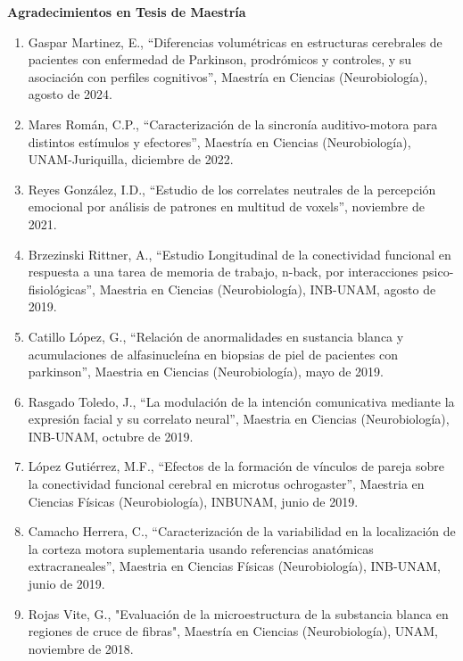 \textbf{Agradecimientos en Tesis de Maestría}

\hfill

\begin{enumerate}

\item Gaspar Martinez, E., “Diferencias volumétricas en estructuras cerebrales de pacientes con enfermedad de Parkinson, 
prodrómicos y controles, y su asociación con perfiles cognitivos”, Maestría en Ciencias (Neurobiología), agosto de 2024.

\item Mares Román, C.P., “Caracterización de la sincronía auditivo-motora para distintos estímulos y efectores”, Maestría 
en 
Ciencias (Neurobiología), UNAM-Juriquilla, diciembre de 2022.

\item Reyes González, I.D., “Estudio de los correlates neutrales de la percepción emocional por análisis de patrones en 
multitud de voxels”, noviembre de 2021.

\item Brzezinski Rittner, A., “Estudio Longitudinal de la conectividad funcional en respuesta a una tarea de memoria de 
trabajo, n-back, por interacciones psico-fisiológicas”, Maestria en Ciencias (Neurobiología), INB-UNAM, agosto de 2019.

\item Catillo López, G., “Relación de anormalidades en sustancia blanca y acumulaciones de alfasinucleína en biopsias de 
piel 
de pacientes con parkinson”, Maestria en Ciencias (Neurobiología), mayo de 2019.

\item Rasgado Toledo, J., “La modulación de la intención comunicativa mediante la expresión facial y su correlato neural”, 
Maestria en Ciencias (Neurobiología), INB-UNAM, octubre de 2019.

\item López Gutiérrez, M.F., “Efectos de la formación de vínculos de pareja sobre la conectividad funcional cerebral en 
microtus ochrogaster”, Maestria en Ciencias Físicas (Neurobiología), INBUNAM, junio de 2019.

\item Camacho Herrera, C., “Caracterización de la variabilidad en la localización de la corteza motora suplementaria usando 
referencias anatómicas extracraneales”, Maestria en Ciencias Físicas (Neurobiología), INB-UNAM, junio de 2019.

\item Rojas Vite, G., "Evaluación de la microestructura de la substancia blanca en regiones de cruce de fibras", Maestría 
en 
Ciencias (Neurobiología), UNAM, noviembre de 2018.


\end{enumerate}
